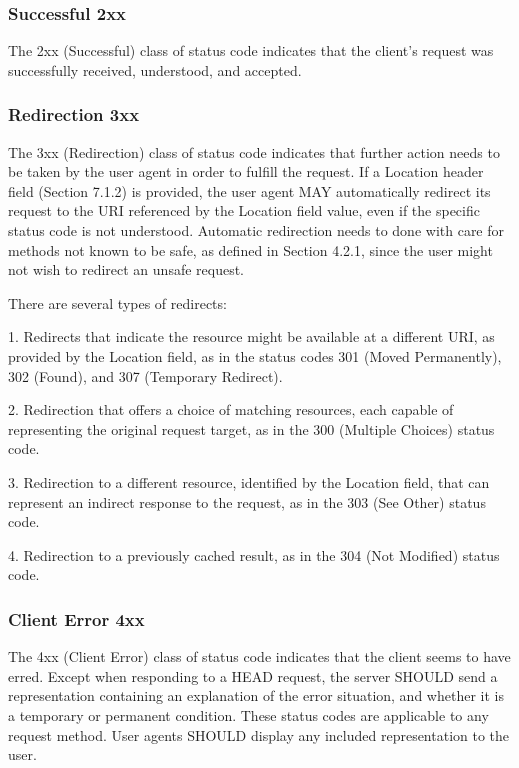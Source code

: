    \subsubsection*{Successful 2xx}

   The 2xx (Successful) class of status code indicates that the client's
   request was successfully received, understood, and accepted.



   \subsubsection*{Redirection 3xx}

   The 3xx (Redirection) class of status code indicates that further
   action needs to be taken by the user agent in order to fulfill the
   request.  If a Location header field (Section 7.1.2) is provided, the
   user agent MAY automatically redirect its request to the URI
   referenced by the Location field value, even if the specific status
   code is not understood.  Automatic redirection needs to done with
   care for methods not known to be safe, as defined in Section 4.2.1,
   since the user might not wish to redirect an unsafe request.

   There are several types of redirects:

   1.  Redirects that indicate the resource might be available at a
       different URI, as provided by the Location field, as in the
       status codes 301 (Moved Permanently), 302 (Found), and 307
       (Temporary Redirect).

   2.  Redirection that offers a choice of matching resources, each
       capable of representing the original request target, as in the
       300 (Multiple Choices) status code.

   3.  Redirection to a different resource, identified by the Location
       field, that can represent an indirect response to the request, as
       in the 303 (See Other) status code.

   4.  Redirection to a previously cached result, as in the 304 (Not
       Modified) status code.



\subsubsection*{Client Error 4xx}

   The 4xx (Client Error) class of status code indicates that the client
   seems to have erred.  Except when responding to a HEAD request, the
   server SHOULD send a representation containing an explanation of the
   error situation, and whether it is a temporary or permanent
   condition.  These status codes are applicable to any request method.
   User agents SHOULD display any included representation to the user.




